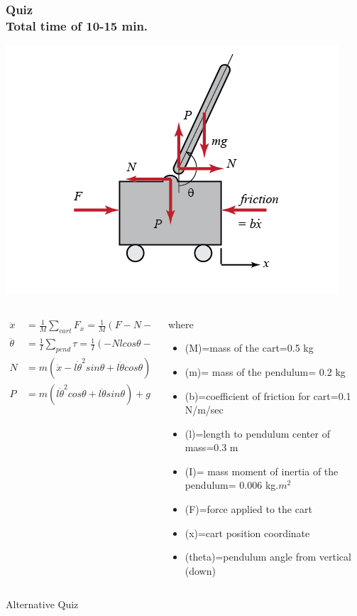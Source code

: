 \documentclass[hyperref={pdfpagelabels=true}]{beamer}
\newcounter{angle}
\begin{document}
\begin{frame}[shrink]
\frametitle{Quiz \\ Total time of 10-15 min.}
\centering
\includegraphics[scale = 0.35]{figs/Selection_045.png} \\

\begin{columns}

\begin{column}{0.45\textwidth}
\small{
\begin{align*}
\ddot{x}&=\frac{1}{M}\sum_{cart}F_x=\frac{1}{M}(F-N-b\dot{x}) \ &\text{(1)} \\
\ddot{\theta}&=\frac{1}{I}\sum_{pend}\tau=\frac{1}{I}(-Nlcos\theta-Plsin\theta) \ &\text{(2)} \\
N&=m(\ddot{x}-l\dot{\theta}^2sin\theta+l\ddot{\theta}cos\theta) \ &\text{(3)} \\
P&=m(l\dot{\theta}^2 cos\theta+l\ddot{\theta}sin\theta)+g \ &\text{(4)}
\end{align*}
}
\end{column}

\begin{column}{0.5\textwidth}
\tiny{
where \\
\begin{itemize}
\item (M)=mass of the cart=0.5 kg
\item (m)= mass of the pendulum= 0.2 kg
\item (b)=coefficient of friction for cart=0.1 N/m/sec
\item (l)=length to pendulum center of mass=0.3 m
\item (I)= mass moment of inertia of the pendulum= 0.006 kg.$m^2$
\item (F)=force applied to the cart
\item (x)=cart position coordinate 
\item (theta)=pendulum angle from vertical (down)
\end{itemize}
}
\end{column}
\end{columns}

\noindent\makebox[\linewidth]{\rule{10 cm}{0.1pt}}
{\tiny Alternative Quiz}
\href{http://ctms.engin.umich.edu/CTMS/index.php?example=BallBeam&section=SimulinkModeling}{}
\end{frame}
\end{document}
